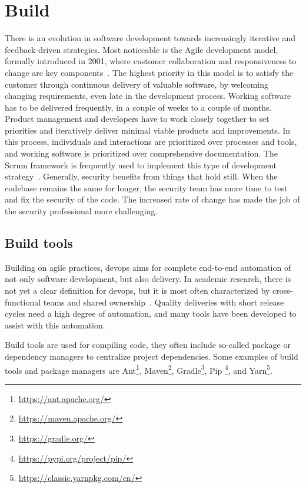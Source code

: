 \section{Build}
\label{sec:related-build}
There is an evolution in software development towards increasingly iterative and feedback-driven strategies.
Most noticeable is the Agile development model, formally introduced in 2001, where customer collaboration and responsiveness to change are key components~\cite{fowler2001agile}.
The highest priority in this model is to satisfy the customer through continuous delivery of valuable software, by welcoming changing requirements, even late in the development process.
Working software has to be delivered frequently, in a couple of weeks to a couple of months.
Product management and developers have to work closely together to set priorities and iteratively deliver minimal viable products and improvements.
In this process, individuals and interactions are prioritized over processes and tools, and working software is prioritized over comprehensive documentation.
The Scrum framework is frequently used to implement this type of development strategy~\cite{schwaber2004agile}.
Generally, security benefits from things that hold still.
When the codebase remains the same for longer, the security team has more time to test and fix the security of the code.
The increased rate of change has made the job of the security professional more challenging.

\subsection{Build tools}
Building on agile practices, \gls{devops} aims for complete end-to-end automation of not only software development, but also delivery.
In academic research, there is not yet a clear definition for \gls{devops}, but it is most often characterized by cross-functional teams and shared ownership~\cite{erich2017qualitative,ebert2016devops}.
Quality deliveries with short release cycles need a high degree of automation, and many tools have been developed to assist with this automation.

Build tools are used for compiling code, they often include so-called package or dependency managers to centralize project dependencies.
Some examples of build tools and package managers are Ant\footnote{\url{https://ant.apache.org/}}, Maven\footnote{\url{https://maven.apache.org/}}, Gradle\footnote{\url{https://gradle.org/}},
Pip \footnote{\url{https://pypi.org/project/pip/}}, and Yarn\footnote{\url{https://classic.yarnpkg.com/en/}}.

